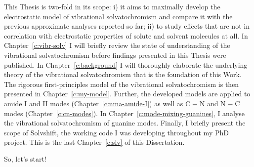 \documentclass[b5paper,oneside,fleqn,11pt]{book}
\begin{document}
\begin{refsection}
This Thesis is two\hyp{}fold in its scope: i) it aims to maximally develop
the electrostatic model of vibrational solvatochromism and compare it
with the previous approximate analyses reported so far; ii) to
study effects that are not in correlation with electrostatic properties
of solute and solvent molecules at all. In Chapter~\ref{c:vibr-solv} I will 
briefly review the state of understanding of the vibrational solvatochromism
before findings presented in this Thesis were published. In Chapter~\ref{c:background}
I will thoroughly elaborate the underlying theory of the vibrational
solvatochromism that is the foundation of this Work. The rigorous first\hyp{}principles
model of the vibrational solvatochromism is then presented in Chapter~\ref{c:my-model}.
Further, the developed models are applied to amide I and II modes (Chapter~\ref{c:nma-amide-I})
as well as
C$\equiv$N and N$\equiv$C modes (Chapter~\ref{c:cn-modes}). In Chapter~\ref{c:mode-mixing-guanines},
I analyse the vibrational solvatochromism of guanine modes. Finally,
I briefly present the scope of {\sc Solvshift}, the working code I was developing throughout
my PhD project. This is the last Chapter~\ref{c:slv} of this Dissertation.


So, let's start!

\printbibliography[heading=subbibintoc,title={References}]
\end{refsection}
\end{document}

